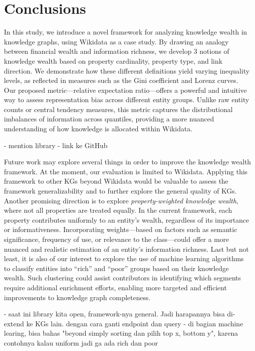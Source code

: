 \section{Conclusions}

In this study, we introduce a novel framework for analyzing knowledge wealth in knowledge graphs, using Wikidata as a case study. By drawing an analogy between financial wealth and information richness, we develop 3 notions of knowledge wealth based on property cardinality, property type, and link direction. We demonstrate how these different definitions yield varying inequality levels, as reflected in measures such as the Gini coefficient and Lorenz curves. Our proposed metric—relative expectation ratio—offers a powerful and intuitive way to assess representation bias across different entity groups. Unlike raw entity counts or central tendency measures, this metric captures the distributional imbalances of information across quantiles, providing a more nuanced understanding of how knowledge is allocated within Wikidata.

- mention library
- link ke GitHub

Future work may explore several things in order to improve the knowledge wealth framework. At the moment, our evaluation is limited to Wikidata. Applying this framework to other KGs beyond Wikidata would be valuable to assess the framework generalizability and to further explore the general quality of KGs. Another promising direction is to explore \textit{property-weighted knowledge wealth}, where not all properties are treated equally. In the current framework, each property contributes uniformly to an entity’s wealth, regardless of its importance or informativeness. Incorporating weights—based on factors such as semantic significance, frequency of use, or relevance to the class—could offer a more nuanced and realistic estimation of an entity's information richness. Last but not least, it is also of our interest to explore the use of machine learning algorithms to classify entities into “rich” and “poor” groups based on their knowledge wealth. Such clustering could assist contributors in identifying which segments require additional enrichment efforts, enabling more targeted and efficient improvements to knowledge graph completeness.

- saat ini library kita open, framework-nya general. Jadi harapannya bisa di-extend ke KGs lain. dengan cara ganti endpoint dan query
- di bagian machine learing, bisa bahas "beyond simply sorting dan pilih top x, bottom y", karena contohnya kalau uniform jadi ga ada rich dan poor